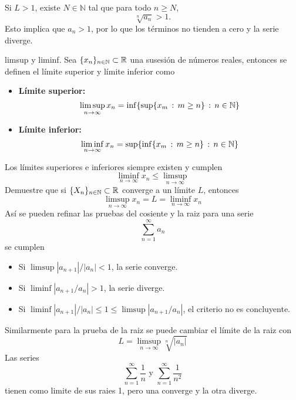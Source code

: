 \documentclass[main.tex]{subfiles}
\begin{document}
Si \(L > 1\), existe \(N \in \mathbb{N}\) tal que para todo \(n \geq N\),
\[
\sqrt[n]{a_n} > 1.
\]
Esto implica que \(a_n > 1\), por lo que los términos no tienden a cero y la serie diverge.
\QED\\
\begin{def.}{limsup y liminf.}
Sea \(\{x_n\}_{n\in \mathbb N }\subset\mathbb R \) una susesión de números reales, entonces se definen el límite superior y límite inferior como
\begin{itemize}
\item \textbf{Límite superior:}
    \[\limsup_{n\to\infty}x_n=\inf\{\sup\{x_m\,:\,m\geq n\}\,:\,n\in \mathbb N \}\]
\item \textbf{Límite inferior:}
    \[\liminf_{n\to\infty}x_n=\sup\{\inf\{x_m\,:\,m\geq n\}\,:\,n\in \mathbb N \}\]
\end{itemize}
\end{def.}
\obs Los límites superiores e inferiores siempre existen y cumplen
\[
\liminf_{n\to\infty}x_n\leq\limsup_{n\to\infty}
\]
\exe Demuestre que si \(\{X_n\}_{n\in \mathbb N }\subset\mathbb R \) converge a un límite \(L\), entonces
\[
\limsup_{n\to\infty}x_n=L=\liminf_{n\to\infty}x_n
\]
Así se pueden refinar las pruebas del cosiente y la raiz para una serie
\[
\sum_{n=1}^\infty a_n
\]
se cumplen
\begin{itemize}
    \item Si \(\limsup|a_{n+1}|/|a_n| < 1\), la serie converge.
    \item Si \(\liminf|a_{n+1}/a_n| > 1\), la serie diverge.
    \item Si \(\liminf|a_{n+1}|/|a_n| \leq 1\leq\limsup|a_{n+1}/a_n|\), el criterio no es concluyente.
\end{itemize}
\noindent Similarmente para la prueba de la raiz se puede cambiar el límite de la raiz con
\[
L=\limsup_{n\to\infty}\sqrt[n]{|a_n|}
\]
\obs Las series
\[
\sum_{n=1}^{\infty}\frac{1}{n}\text{ y }\sum_{n=1}^{\infty}\frac{1}{n^2}
\]
tienen como limite de sus raies 1, pero una converge y la otra diverge.
\end{document}
